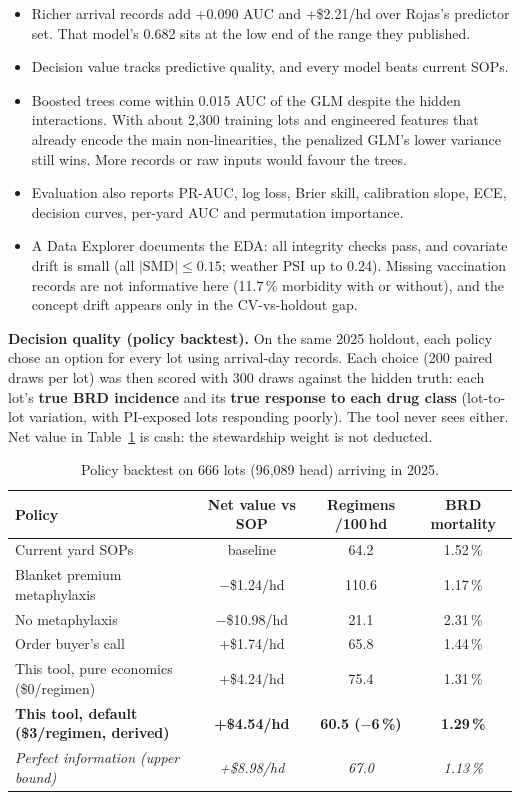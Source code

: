\documentclass[10pt,letterpaper]{article}
\newcommand{\pct}{\,\%}
\newcommand{\usd}[1]{\$#1}
\newcommand{\lead}[1]{\textbf{#1}\enspace}
\begin{document}
\begin{itemize}
  \item Richer arrival records add +0.090 AUC and +\usd{2.21}/hd over Rojas's predictor set. That model's 0.682 sits at the low end of the range they published.
  \item Decision value tracks predictive quality, and every model beats current SOPs.
  \item Boosted trees come within 0.015 AUC of the GLM despite the hidden interactions. With about 2,300 training lots and engineered features that already encode the main non-linearities, the penalized GLM's lower variance still wins. More records or raw inputs would favour the trees.
  \item Evaluation also reports PR-AUC, log loss, Brier skill, calibration slope, ECE, decision curves, per-yard AUC and permutation importance.
  \item A Data Explorer documents the EDA: all integrity checks pass, and covariate drift is small (all $|\mathrm{SMD}| \leq 0.15$; weather PSI up to 0.24). Missing vaccination records are not informative here (11.7\pct{} morbidity with or without), and the concept drift appears only in the CV-vs-holdout gap.
\end{itemize}

\lead{Decision quality (policy backtest).} On the same 2025 holdout, each policy chose an option for every lot using arrival-day records. Each choice (200 paired draws per lot) was then scored with 300 draws against the hidden truth: each lot's \textbf{true BRD incidence} and its \textbf{true response to each drug class} (lot-to-lot variation, with PI-exposed lots responding poorly). The tool never sees either. Net value in Table~\ref{tab:backtest} is cash: the stewardship weight is not deducted.

\begin{table}[h]
\centering\small
\caption{Policy backtest on 666 lots (96,089 head) arriving in 2025.}\label{tab:backtest}
\begin{tabular}{@{}lccc@{}}
\toprule
\textbf{Policy} & \textbf{Net value vs SOP} & \textbf{Regimens /100\,hd} & \textbf{BRD mortality} \\
\midrule
Current yard SOPs & baseline & 64.2 & 1.52\pct \\
Blanket premium metaphylaxis & $-$\usd{1.24}/hd & 110.6 & 1.17\pct \\
No metaphylaxis & $-$\usd{10.98}/hd & 21.1 & 2.31\pct \\
Order buyer's call & +\usd{1.74}/hd & 65.8 & 1.44\pct \\
This tool, pure economics (\usd{0}/regimen) & +\usd{4.24}/hd & 75.4 & 1.31\pct \\
\textbf{This tool, default (\usd{3}/regimen, derived)} & \textbf{+\usd{4.54}/hd} & \textbf{60.5 ($-$6\pct)} & \textbf{1.29\pct} \\
\emph{Perfect information (upper bound)} & \emph{+\usd{8.98}/hd} & \emph{67.0} & \emph{1.13\pct} \\
\bottomrule
\end{tabular}
\end{table}
\end{document}
